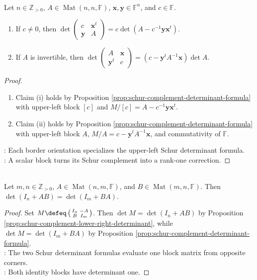 \begin{proposition} \label{prop:bordered-determinant-formulas} \\
Let $n\in\mathbb{Z}_{>0}$, $A\in\operatorname{Mat}(n,n,\mathbb{F})$, $\mathbf{x},\mathbf{y}\in\mathbb{F}^n$, and $c\in\mathbb{F}$.
\begin{enumerate}[label=(\roman*)]
\setlength{\itemsep}{0pt}
\item If $c\neq0$, then $\det\left(\begin{smallmatrix}c&\mathbf{x}^t\\\mathbf{y}&A\end{smallmatrix}\right)=c\det\left(A-c^{-1}\mathbf{y}\mathbf{x}^t\right)$.
\item If $A$ is invertible, then $\det\left(\begin{smallmatrix}A&\mathbf{x}\\\mathbf{y}^t&c\end{smallmatrix}\right)=\left(c-\mathbf{y}^tA^{-1}\mathbf{x}\right)\det A$.
\end{enumerate}
\begin{proof}
\begin{enumerate}[label=(\roman*)]
\setlength{\itemsep}{0pt}
\item Claim (i) holds by Proposition \ref{prop:schur-complement-determinant-formula} with upper-left block $[c]$ and $M/[c]=A-c^{-1}\mathbf{y}\mathbf{x}^t$.
\item Claim (ii) holds by Proposition \ref{prop:schur-complement-determinant-formula} with upper-left block $A$, $M/A=c-\mathbf{y}^tA^{-1}\mathbf{x}$, and commutativity of $\mathbb{F}$.
\end{enumerate}
: Each border orientation specializes the upper-left Schur determinant formula.\\
: A scalar block turns its Schur complement into a rank-one correction.
\end{proof}
\end{proposition}

\begin{theorem} \label{thm:sylvester-determinant-identity} \\
Let $m,n\in\mathbb{Z}_{>0}$, $A\in\operatorname{Mat}(n,m,\mathbb{F})$, and $B\in\operatorname{Mat}(m,n,\mathbb{F})$. Then $\det(I_n+AB)=\det(I_m+BA)$.
\begin{proof}
Set $M\defeq\left(\begin{smallmatrix}I_n&-A\\B&I_m\end{smallmatrix}\right)$. Then $\det M=\det(I_n+AB)$ by Proposition \ref{prop:schur-complement-lower-right-determinant}, while $\det M=\det(I_m+BA)$ by Proposition \ref{prop:schur-complement-determinant-formula}.\\
: The two Schur determinant formulas evaluate one block matrix from opposite corners.\\
: Both identity blocks have determinant one.
\end{proof}
\end{theorem}

